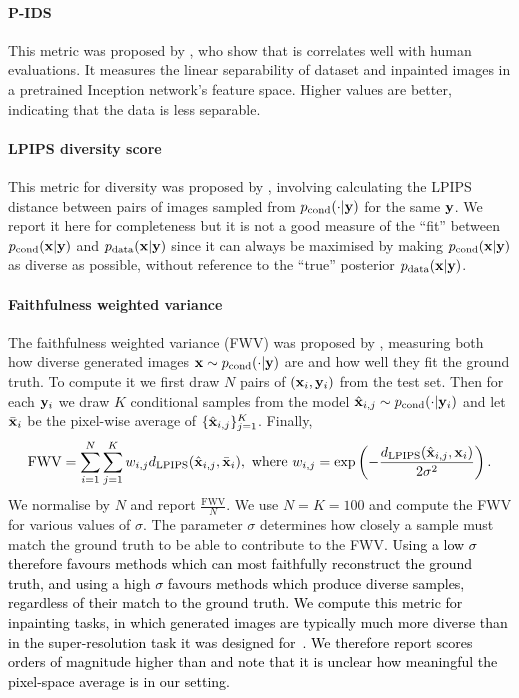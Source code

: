 \paragraph{P-IDS}
This metric was proposed by \citet{zhao2021large}, who show that is correlates
well with human evaluations. It measures the linear separability of dataset and
inpainted images in a pretrained Inception network's feature space. Higher
values are better, indicating that the data is less separable.
%

\paragraph{LPIPS diversity score}
This metric for diversity was proposed by \citet{zhu2017toward}, involving
calculating the LPIPS distance between pairs of images sampled from
$p_{\text{cond}}{}(\cdot|\mathbf{y}{})$ for the same $\mathbf{y}{}$. We report it here for
completeness but it is not a good measure of the ``fit'' between
$p_{\text{cond}}{}(\mathbf{x}{}|\mathbf{y}{})$ and $p_{\rm{data}}{}(\mathbf{x}{}|\mathbf{y}{})$ since it can always be
maximised by making $p_{\text{cond}}{}(\mathbf{x}{}|\mathbf{y}{})$ as diverse as possible, without
reference to the ``true'' posterior $p_{\rm{data}}{}(\mathbf{x}{}|\mathbf{y}{})$.

\paragraph{Faithfulness weighted variance}
The faithfulness weighted variance (FWV) was proposed by
\citet{li2020multimodal}, measuring both how diverse generated images
$\mathbf{x}{}\sim p_{\text{cond}}{}(\cdot|\mathbf{y}{})$ are and how well they fit the ground truth.
To compute it we first draw $N$ pairs of $(\mathbf{x}{}_i, \mathbf{y}{}_i)$ from the test
set. Then for each $\mathbf{y}{}_i$ we draw $K$ conditional samples from the model
$\hat{\mathbf{x}{}}_{i,j} \sim p_{\text{cond}}(\cdot | \mathbf{y}{}_i)$ and let $\bar{\mathbf{x}{}}_i$ be the
pixel-wise average of $\{\hat{\mathbf{x}{}}_{i,j}\}_{j=1}^K$. Finally,
\begin{equation}
  \text{FWV} = \sum_{i=1}^N \sum_{j=1}^K w_{i,j} d_{\text{LPIPS}}(\hat{\mathbf{x}{}}_{i,j}, \bar{\mathbf{x}{}}_i),
  \text{ where }
  w_{i,j} = \exp \left(- \frac{d_{\text{LPIPS}}(\hat{\mathbf{x}{}}_{i,j}, \mathbf{x}{}_i)}{2\sigma^2} \right).
\end{equation}
We normalise by $N$ and report $\frac{\text{FWV}}{N}$. We use $N = K = 100$ and
compute the FWV for various values of $\sigma$. The parameter $\sigma$
determines how closely a sample must match the ground truth to be able to
contribute to the FWV. \textcolor{black}{Using a low $\sigma$ therefore favours
  methods which can most faithfully reconstruct the ground truth, and using a
  high $\sigma$ favours methods which produce diverse samples, regardless of
  their match to the ground truth. We compute this metric for inpainting tasks,
  in which generated images are typically much more diverse than in the
  super-resolution task it was designed for~\citep{li2020multimodal}. We
  therefore report scores orders of magnitude higher than
  \citet{li2020multimodal} and note that it is unclear how meaningful the
  pixel-space average is in our setting. }

